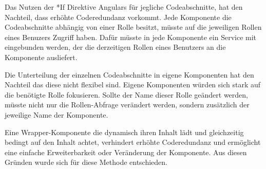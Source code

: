 Das Nutzen der *If Direktive Angulars für jegliche Codeabschnitte, hat den Nachteil, dass erhöhte Coderedundanz vorkommt. Jede Komponente die Codeabschnitte abhängig von einer Rolle besitzt, müsste auf die jeweiligen Rollen eines Benuzers Zugriff haben. Dafür müsste in jede Komponente ein Service mit eingebunden werden, der die derzeitigen Rollen eines Benutzers an die Komponente ausliefert. 

Die Unterteilung der einzelnen Codeabschnitte in eigene Komponenten hat den Nachteil das diese nicht flexibel sind. Eigene Komponenten würden sich stark auf die benötigte Rolle fokusieren. Sollte der Name dieser Rolle geändert werden, müsste nicht nur die Rollen-Abfrage verändert werden, sondern zusätzlich der jeweilige Name der Komponente. 

Eine Wrapper-Komponente die dynamisch ihren Inhalt lädt und gleichzeitig bedingt auf den Inhalt achtet, verhindert erhöhte Coderedundanz und ermöglicht eine einfache Erweiterbarkeit oder Veränderung der Komponente. Aus diesen Gründen wurde sich für diese Methode entschieden.
